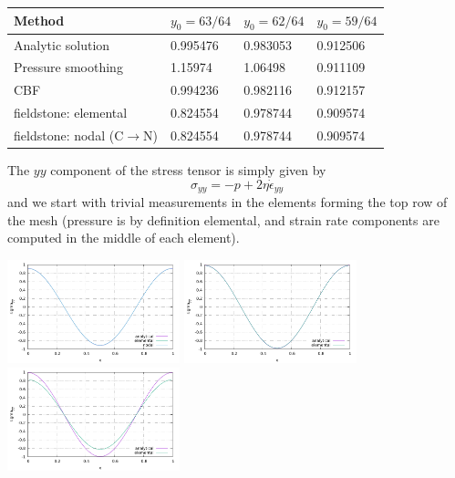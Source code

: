 \begin{center}
\begin{tabular}{l||lll}
\hline
Method             & $y_0=63/64$ & $y_0=62/64$ &  $y_0=59/64$ \\ 
\hline
\hline
Analytic solution                   & 0.995476 & 0.983053  &  0.912506 \\
Pressure smoothing                  & 1.15974  & 1.06498   &  0.911109 \\
CBF                                 & 0.994236 & 0.982116  &  0.912157 \\
\hline
fieldstone: elemental               & 0.824554 & 0.978744  & 0.909574 \\
fieldstone: nodal (C$\rightarrow$N) & 0.824554 & 0.978744  & 0.909574 \\
\hline
\end{tabular}
\end{center}

The $yy$ component of the stress tensor is simply given by
\[
\sigma_{yy} = -p + 2 \eta \dot{\epsilon}_{yy}
\]
and we start with trivial measurements in the elements 
forming the top row of the mesh (pressure is by definition elemental, and strain rate
components are computed in the middle of each element). 

\begin{center}
\includegraphics[width=5cm]{python_codes/fieldstone_27/results/59_64/sigmazz.pdf}
\includegraphics[width=5cm]{python_codes/fieldstone_27/results/62_64/sigmazz.pdf}
\includegraphics[width=5cm]{python_codes/fieldstone_27/results/63_64/sigmazz.pdf}
\end{center}






